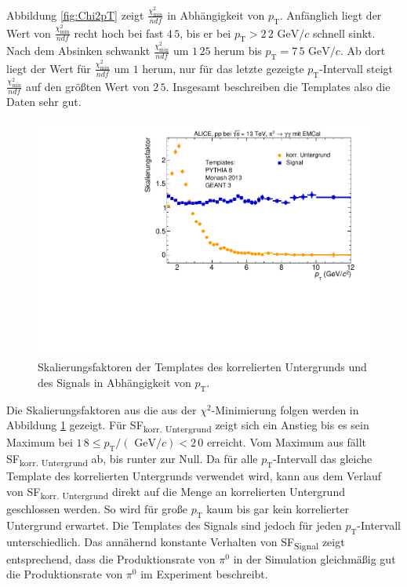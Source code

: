 \newline
Abbildung \ref{fig:Chi2pT} zeigt $\frac{\chi^{2}_\text{min}}{ndf}$ in Abhängigkeit von $p_{\text{T}}$.
Anfänglich liegt der Wert von $\frac{\chi^{2}_\text{min}}{ndf}$ recht hoch bei fast $4\,5$, bis er bei $p_{\text{T}} >2\,2 \text{ GeV}/c$ schnell sinkt.  
Nach dem Absinken schwankt $\frac{\chi^{2}_\text{min}}{ndf}$ um $1\,25$ herum bis $p_{\text{T}} = 7\,5\text{ GeV}/c$.
Ab dort liegt der Wert für $\frac{\chi^{2}_\text{min}}{ndf}$ um $1$ herum, nur für das letzte gezeigte $p_{\text{T}}$-Intervall steigt $\frac{\chi^{2}_\text{min}}{ndf}$ auf den größten Wert von $2\,5$.
Insgesamt beschreiben die Templates also die Daten sehr gut.
\begin{figure}[tp]
\centering
\includegraphics[width=.65\linewidth]{SF_Data_2016.pdf}
\caption{Skalierungsfaktoren der Templates des korrelierten Untergrunds und des Signals in Abhängigkeit von $p_{\text{T}}$.
}
\label{fig:SF}
\end{figure}
\newline
Die Skalierungsfaktoren aus die aus der $\chi^{2}$-Minimierung folgen werden in Abbildung \ref{fig:SF} gezeigt.
Für SF\textsubscript{korr. Untergrund} zeigt sich ein Anstieg bis es sein Maximum bei $1\,8 \leq p_{\text{T}}/(\text{ GeV}/c) < 2\,0$ erreicht.
Vom Maximum aus fällt SF\textsubscript{korr. Untergrund} ab, bis runter zur Null.
Da für alle $p_{\text{T}}$-Intervall das gleiche Template des korrelierten Untergrunds verwendet wird, kann aus dem Verlauf von SF\textsubscript{korr. Untergrund} direkt auf die Menge an korrelierten Untergrund geschlossen werden.
So wird für große $p_{\text{T}}$ kaum bis gar kein korrelierter Untergrund erwartet.
\newline
Die Templates des Signals sind jedoch für jeden $p_{\text{T}}$-Intervall unterschiedlich.
Das annähernd konstante Verhalten von SF\textsubscript{Signal} zeigt entsprechend, dass die Produktionsrate von $\pi^{0}$ in der Simulation gleichmäßig gut die Produktionsrate von $\pi^{0}$ im Experiment beschreibt.